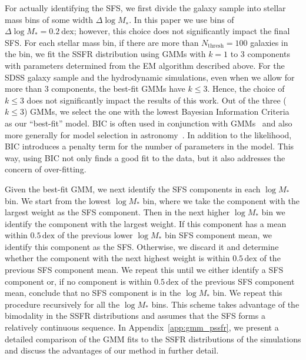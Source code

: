 \documentclass[tighten, preprint]{aastex62}
\begin{document}
For actually identifying the SFS, we first divide the galaxy 
sample into stellar mass bins of some width $\Delta \log M_∗$. In this paper 
we use bins of $\Delta \log M_* = 0.2\ \mathrm{dex}$; however, this 
choice does not significantly impact the final SFS. For each stellar 
mass bin, if there are more than $N_\mathrm{thresh}{=}100$ galaxies in the bin, 
we fit the SSFR distribution using GMMs with $k{=}1$ to 3 components with 
parameters determined from the EM algorithm described above. 
For the SDSS galaxy sample and the hydrodynamic simulations, even when we 
allow for more than 3 components, the best-fit GMMs have $k\leq3$. Hence, the 
choice of $k\leq3$ does not significantly impact the results of this work.
Out of the three ($k\leq3$) GMMs, we select the one with the lowest Bayesian 
Information Criteria~\citep[BIC;][]{schwarz1978} as our ``best-fit'' model. 
BIC is often used in conjunction with GMMs~\citep[\emph{e.g.}][]{leroux1992,roeder1997,fraley1998,steele2010performance} 
and also more generally for model selection in 
astronomy~\citep[\emph{e.g.}][]{liddle2007,broderick2011,vakili2016}.
In addition to the likelihood, BIC introduces a penalty term for the number
of parameters in the model. This way, using BIC not only finds a good fit to 
the data, but it also addresses the concern of over-fitting. 

Given the best-fit GMM, we next identify the SFS components in each $\log M_*$
bin. We start from the lowest $\log M_*$ bin, where we take the component with 
the largest weight as the SFS component. Then in the next higher $\log M_*$ bin
we identify the component with the largest weight. If this 
component has a mean within $0.5\,\mathrm{dex}$ of the previous lower $\log M_*$ 
bin SFS component mean, we identify this component as the SFS. Otherwise, we 
discard it and determine whether the component with the next highest weight 
is within $0.5\,\mathrm{dex}$ of the previous SFS component mean. We 
repeat this until we either identify a SFS component or, if no 
component is within $0.5\,\mathrm{dex}$ of the previous SFS component mean,
conclude that no SFS component is in the $\log M_*$ bin. We repeat this 
procedure recursively for all the $\log M_*$ bins. This scheme takes advantage 
of the bimodality in the SSFR distributions and assumes that the SFS forms a 
relatively continuous sequence. In Appendix~\ref{app:gmm_pssfr}, we present a 
detailed comparison of the GMM fits to the SSFR distributions of the simulations 
and discuss the advantages of our method in further detail.
\end{document}
